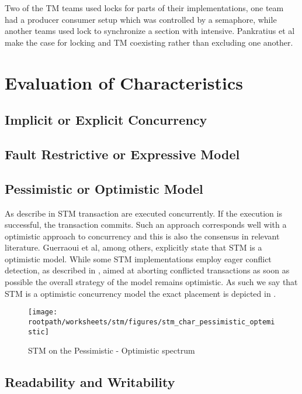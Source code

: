 Two of the \ac{TM} teams used locks for parts of their implementations, one team had a producer consumer setup which was controlled by a semaphore, while another teams used lock to synchronize a section with intensive\cite[p. 5]{pankratius2009does}. Pankratius et al make the case for locking and \ac{TM} coexisting rather than excluding one another.

\section{Evaluation of Characteristics}


\label{sec:stm_eval}
\subsection{Implicit or Explicit Concurrency}
\subsection{Fault Restrictive or Expressive Model}
\subsection{Pessimistic or Optimistic Model}
As describe in  \ac{STM} transaction are executed concurrently. If the execution is successful, the transaction commits. Such an approach corresponds well with a optimistic approach to concurrency and this is also the consensus in relevant literature. Guerraoui et al, among others, explicitly state that \ac{STM} is a optimistic model\cite[p. 1]{guerraoui2005toward}. While some \ac{STM} implementations employ eager conflict detection, as described in , aimed at aborting conflicted transactions as soon as possible the overall strategy of the model remains optimistic. As such we say that \ac{STM} is a optimistic concurrency model the exact placement is depicted in .

\begin{figure}[htbp]
\centering
 \texttt{[image: \\rootpath/worksheets/stm/figures/stm\_char\_pessimistic\_optemistic]} 
 \caption{\ac{STM} on the Pessimistic - Optimistic spectrum}
\label{fig:stm_char_pes_opti}
\end{figure}
\subsection{Readability and Writability}
\worksheetend